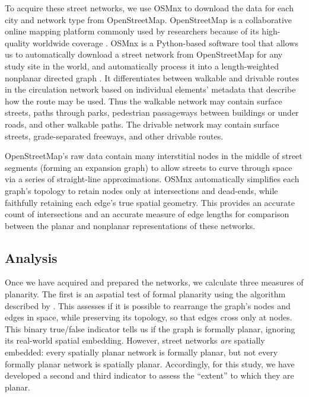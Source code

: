 \documentclass[Afour,sageh,times]{sagej}
\begin{document}
To acquire these street networks, we use OSMnx to download the data for each city and network type from OpenStreetMap. OpenStreetMap is a collaborative online mapping platform commonly used by researchers because of its high-quality worldwide coverage \citep{haklay_how_2010,jokar_arsanjani_openstreetmap_2015}. OSMnx is a Python-based software tool that allows us to automatically download a street network from OpenStreetMap for any study site in the world, and automatically process it into a length-weighted nonplanar directed graph \citep{boeing_osmnx:_2017}. It differentiates between walkable and drivable routes in the circulation network based on individual elements' metadata that describe how the route may be used. Thus the walkable network may contain surface streets, paths through parks, pedestrian passageways between buildings or under roads, and other walkable paths. The drivable network may contain surface streets, grade-separated freeways, and other drivable routes.

OpenStreetMap's raw data contain many interstitial nodes in the middle of street segments (forming an expansion graph) to allow streets to curve through space via a series of straight-line approximations. OSMnx automatically simplifies each graph's topology to retain nodes only at intersections and dead-ends, while faithfully retaining each edge's true spatial geometry. This provides an accurate count of intersections and an accurate measure of edge lengths for comparison between the planar and nonplanar representations of these networks.

\subsection{Analysis}

Once we have acquired and prepared the networks, we calculate three measures of planarity. The first is an aspatial test of formal planarity using the algorithm described by \citet{boyer_subgraph_2012}. This assesses if it is possible to rearrange the graph's nodes and edges in space, while preserving its topology, so that edges cross only at nodes. This binary true/false indicator tells us if the graph is formally planar, ignoring its real-world spatial embedding. However, street networks \emph{are} spatially embedded: every spatially planar network is formally planar, but not every formally planar network is spatially planar. Accordingly, for this study, we have developed a second and third indicator to assess the \enquote{extent} to which they are planar.
\end{document}
